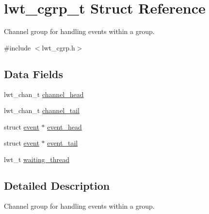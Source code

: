 \hypertarget{structlwt__cgrp}{\section{lwt\+\_\+cgrp\+\_\+t Struct Reference}
\label{structlwt__cgrp}
}


Channel group for handling events within a group.  




{\ttfamily \#include $<$lwt\+\_\+cgrp.\+h$>$}

\subsection*{Data Fields}
\begin{DoxyCompactItemize}
\item 
lwt\+\_\+chan\+\_\+t \hyperlink{structlwt__cgrp_a50c0e0c6ae5d35a6fcb1c42098e3fc4d}{channel\+\_\+head}
\item 
lwt\+\_\+chan\+\_\+t \hyperlink{structlwt__cgrp_addf100f46a0a912555c71bb1efe43380}{channel\+\_\+tail}
\item 
struct \hyperlink{structevent}{event} $\ast$ \hyperlink{structlwt__cgrp_a0b10e0f366557a71518836f2c12328f5}{event\+\_\+head}
\item 
struct \hyperlink{structevent}{event} $\ast$ \hyperlink{structlwt__cgrp_a180417922953d4a26cf88f429dde623e}{event\+\_\+tail}
\item 
lwt\+\_\+t \hyperlink{structlwt__cgrp_ac77ed0ee0cf31bd27b995749f819c32b}{waiting\+\_\+thread}
\end{DoxyCompactItemize}


\subsection{Detailed Description}
Channel group for handling events within a group. 


